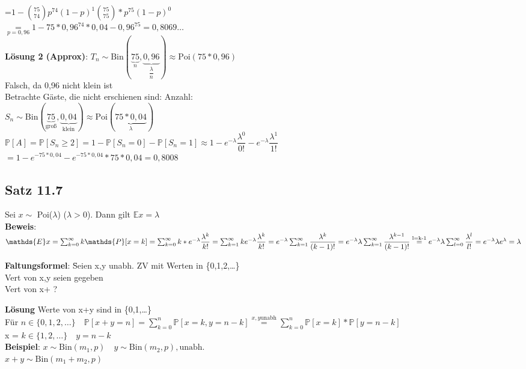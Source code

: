 =$1-\binom{75}{74}p^{74}(1-p)^1\binom{75}{75}*p^{75}(1-p)^0$\smallskip\\
$\underset{p = 0,96}{=} 1- 75*0,96^{74}*0,04-0,96^{75}=0,8069\dots$\medskip\\
\textbf{Lösung 2 (Approx)}: $T_n \sim \text{Bin}(\underbrace{75}_n,\underbrace{0,96}_{\dfrac{\lambda}{n}})  \approx \text{Poi}(75*0,96)$\smallskip\\
Falsch, da 0,96 nicht klein ist\medskip\\
Betrachte Gäste, die nicht erschienen sind: Anzahl:\smallskip\\
$S_n \sim \text{Bin}(\underbrace{75}_\text{groß},\underbrace{0,04}_\text{klein}) \approx \text{Poi}(\underbrace{75*0,04}_\lambda)$\medskip\\
$\mathds{P}[A] = \mathds{P}[S_n \geq 2] = 1- \mathds{P}[S_n = 0] - \mathds{P}[S_n = 1] \approx 1- e ^{-\lambda}\dfrac{\lambda^0}{0!}-e ^{-\lambda}\dfrac{\lambda^1}{1!}$\smallskip\\
$=1-e^{-75*0,04}-e^{-75*0,04}*75*0,04=0,8008$
\subsection{Satz 11.7}
Sei $x \sim $ Poi($ \lambda $) ($\lambda >0$). Dann gilt $\mathds{E}x= \lambda$\medskip\\
\textbf{Beweis}:\\
\begin{math}
\mathds{E}x = \sum_{k=0}^\infty k \mathds{P}[x=k]= \sum_{k=0}^\infty k *e^{-\lambda}\dfrac{\lambda^k}{k!}\smallskip\\
=\sum_{k=1}^\infty ke^{-\lambda}\dfrac{\lambda^k}{k!} = e^{-\lambda}\sum_{k=1}^\infty \dfrac{\lambda^k}{(k-1)!}\smallskip\\
=e^{-\lambda}\lambda\sum_{k=1}^\infty \dfrac{\lambda^{k-1}}{(k-1)!}\overset{\text{l=k-1}}{=} e^{-\lambda}\lambda\sum_{l=0}^{\infty}\dfrac{\lambda^l}{l!}=e^{-\lambda} \lambda e^\lambda = \lambda
\end{math}\medskip\\
\begin{tabbing}
	\textbf{Faltungsformel}: \= Seien x,y unabh. ZV mit Werten in \{0,1,2,\dots\}\\
	\> Vert von x,y seien gegeben\\
	\> Vert von x+ ?
\end{tabbing} 
\textbf{Lösung} Werte von x+y sind in \{0,1,\dots\}\smallskip\\
Für $n \in \{0,1,2,\dots\} \quad \mathds{P}[x+y=n]=\sum_{k=0}^n\mathds{P}[x=k,y=n-k] \overset{x,y \text{unabh}}{=}\sum_{k=0}^n\mathds{P}[x=k]*\mathds{P}[y=n-k]$\smallskip\\
x = $k \in \{1,2,\dots\} \quad y = n-k$\medskip\\
\textbf{Beispiel}: $x \sim \text{Bin}(m_1,p) \quad y \sim \text{Bin}(m_2,p), \text{unabh.}$\smallskip\\
$x+y \sim \text{Bin}(m_1+m_2,p)$